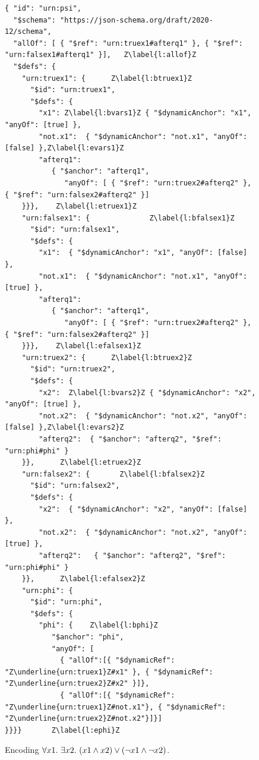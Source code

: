 \begin{figure}
\begin{querybox}{}
\begin{lstlisting}[style=query,escapechar=Z]
{ "id": "urn:psi",
  "$schema": "https://json-schema.org/draft/2020-12/schema",
  "allOf": [ { "$ref": "urn:truex1#afterq1" }, { "$ref": "urn:falsex1#afterq1" }],   Z\label{l:allof}Z
  "$defs": {
    "urn:truex1": {      Z\label{l:btruex1}Z
      "$id": "urn:truex1",
      "$defs": {
        "x1": Z\label{l:bvars1}Z { "$dynamicAnchor": "x1", "anyOf": [true] },
        "not.x1":  { "$dynamicAnchor": "not.x1", "anyOf": [false] },Z\label{l:evars1}Z
        "afterq1":
           { "$anchor": "afterq1",
              "anyOf": [ { "$ref": "urn:truex2#afterq2" },  { "$ref": "urn:falsex2#afterq2" }]
    }}},    Z\label{l:etruex1}Z
    "urn:falsex1": {              Z\label{l:bfalsex1}Z
      "$id": "urn:falsex1",
      "$defs": {
        "x1":  { "$dynamicAnchor": "x1", "anyOf": [false] },
        "not.x1":  { "$dynamicAnchor": "not.x1", "anyOf": [true] },
        "afterq1":
           { "$anchor": "afterq1",
              "anyOf": [ { "$ref": "urn:truex2#afterq2" },  { "$ref": "urn:falsex2#afterq2" }]
    }}},    Z\label{l:efalsex1}Z
    "urn:truex2": {      Z\label{l:btruex2}Z
      "$id": "urn:truex2",
      "$defs": {
        "x2":  Z\label{l:bvars2}Z { "$dynamicAnchor": "x2", "anyOf": [true] },
        "not.x2":  { "$dynamicAnchor": "not.x2", "anyOf": [false] },Z\label{l:evars2}Z
        "afterq2":  { "$anchor": "afterq2", "$ref": "urn:phi#phi" }
    }},      Z\label{l:etruex2}Z
    "urn:falsex2": {       Z\label{l:bfalsex2}Z
      "$id": "urn:falsex2",
      "$defs": {
        "x2":  { "$dynamicAnchor": "x2", "anyOf": [false] },
        "not.x2":  { "$dynamicAnchor": "not.x2", "anyOf": [true] },
        "afterq2":   { "$anchor": "afterq2", "$ref": "urn:phi#phi" }
    }},      Z\label{l:efalsex2}Z
    "urn:phi": {   
      "$id": "urn:phi",
      "$defs": {
        "phi": {    Z\label{l:bphi}Z
           "$anchor": "phi", 
           "anyOf": [
             { "allOf":[{ "$dynamicRef": "Z\underline{urn:truex1}Z#x1" }, { "$dynamicRef": "Z\underline{urn:truex2}Z#x2" }]},
             { "allOf":[{ "$dynamicRef": "Z\underline{urn:truex1}Z#not.x1"}, { "$dynamicRef": "Z\underline{urn:truex2}Z#not.x2"}]}] 
}}}}       Z\label{l:ephi}Z
\end{lstlisting}
\end{querybox}
\caption{Encoding  $\forall x1.\ \exists x2.\ (x1 \wedge x2) \vee (\neg x1 \wedge \neg x2)$.} %
\label{fig:encoding}
\end{figure}

